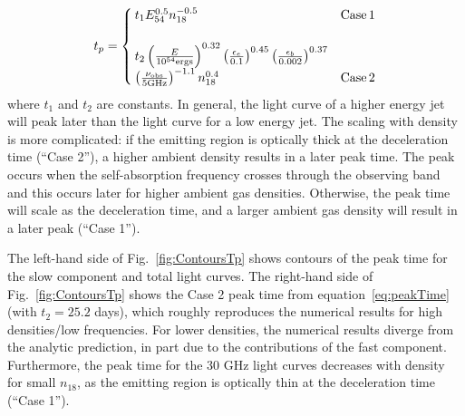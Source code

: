 \documentclass[usenatbib,fleqn]{mnras}
\begin{document}
\begin{align}
t_p=
\begin{cases}
  t_1 E_{54}^{0.5} n_{18}^{-0.5} & {\rm Case \, 1}\\\\
  t_2 \left(\frac{E}{10^{54} {\rm ergs}}\right)^{0.32}
  \left(\frac{\epsilon_e}{0.1}\right)^{0.45}
  \left(\frac{\epsilon_b}{0.002}\right)^{0.37}\\
  \left(\frac{\nu_{\rm obs}}{5 {\rm GHz}}\right)^{-1.1} n_{18}^{0.4} &
  {\rm Case \, 2}
\end{cases}
\label{eq:peakTime}
\end{align}
%
where $t_1$ and $t_2$ are constants. In general, the light curve of a
higher energy jet will peak later than the light curve for a low
energy jet. The scaling with density is more complicated: if the
emitting region is optically thick at the deceleration time (``Case
2''), a higher ambient density results in a later peak time. The peak
occurs when the self-absorption frequency crosses through the
observing band and this occurs later for higher ambient gas
densities. Otherwise, the peak time will scale as the deceleration
time, and a larger ambient gas density will result in a later peak
(``Case 1'').

The left-hand side of Fig.~\ref{fig:ContoursTp} shows contours of the
peak time for the slow component and total light curves. The
right-hand side of Fig.~\ref{fig:ContoursTp} shows the Case 2 peak
time from equation~\eqref{eq:peakTime} (with $t_2=25.2$ days), which roughly
reproduces the numerical results for high densities/low
frequencies. For lower densities, the numerical results diverge from
the analytic prediction, in part due to the contributions of the fast
component.  Furthermore, the peak time for the 30 GHz light curves
decreases with density for small $n_{18}$, as the emitting region is
optically thin at the deceleration time (``Case 1'').
\end{document}
